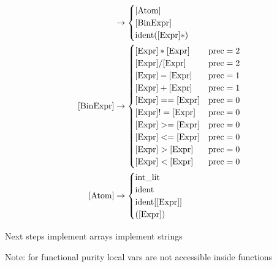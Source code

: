 \documentclass{article}
\begin{document}
\begin{align}
	[\text{Expr}]    & \to
	\begin{cases}
		\text{[Atom]}    \\
		[\text{BinExpr}] \\
		\text{ident}([\text{Expr}]*)
	\end{cases}
	\\
	[\text{BinExpr}] & \to \begin{cases}
		                       [\text{Expr}] * [\text{Expr}]        & \text{prec} = 2 \\
		                       [\text{Expr}] / [\text{Expr}]        & \text{prec} = 2 \\
		                       [\text{Expr}] - [\text{Expr}]        & \text{prec} = 1 \\
		                       [\text{Expr}] + [\text{Expr}]        & \text{prec} = 1 \\
		                       [\text{Expr}] == [\text{Expr}]       & \text{prec} = 0 \\
		                       [\text{Expr}] \space!= [\text{Expr}] & \text{prec} = 0 \\
		                       [\text{Expr}] >= [\text{Expr}]       & \text{prec} = 0 \\
		                       [\text{Expr}] <= [\text{Expr}]       & \text{prec} = 0 \\
		                       [\text{Expr}] > [\text{Expr}]        & \text{prec} = 0 \\
		                       [\text{Expr}] < [\text{Expr}]        & \text{prec} = 0 \\
	                       \end{cases}     \\
	[\text{Atom}]    & \to \begin{cases}
		                       \text{int\_lit}             \\
		                       \text{ident}                \\
		                       \text{ident}[\text{[Expr]}] \\
		                       \text{([Expr])}
	                       \end{cases}
\end{align}

Next steps
implement arrays
implement strings

Note:
for functional purity local vars are not accessible inside functions
\end{document}
